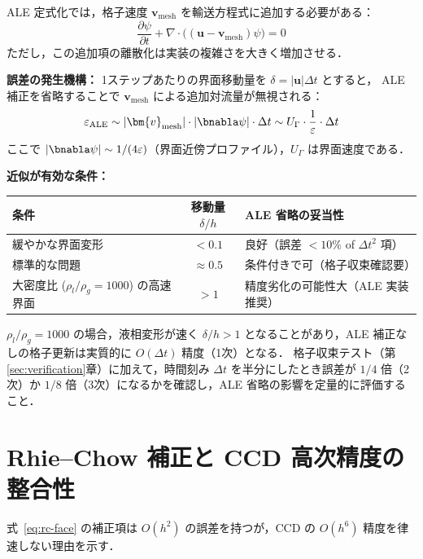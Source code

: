 \begin{tcolorbox}[warnbox, title={ALE 定式化の概要と省略の条件}]
ALE 定式化では，格子速度 $\bm{v}_\text{mesh}$ を輸送方程式に追加する必要がある：
\[
  \frac{\partial\psi}{\partial t} + \nabla\cdot\bigl((\bm{u} - \bm{v}_\text{mesh})\psi\bigr) = 0
\]
ただし，この追加項の離散化は実装の複雑さを大きく増加させる．
\end{tcolorbox}

\textbf{誤差の発生機構：}
1ステップあたりの界面移動量を $\delta = |\bm{u}|\Delta t$ とすると，
ALE 補正を省略することで $\bm{v}_\text{mesh}$ による追加対流量が無視される：
\[
  \varepsilon_{\text{ALE}} \sim |\bm{v}_\text{mesh}| \cdot |\bnabla\psi| \cdot \Delta t \sim U_\Gamma \cdot \frac{1}{\varepsilon} \cdot \Delta t
\]
ここで $|\bnabla\psi| \sim 1/(4\varepsilon)$（界面近傍プロファイル），$U_\Gamma$ は界面速度である．

\textbf{近似が有効な条件：}
\begin{center}
\renewcommand{\arraystretch}{1.3}
\begin{tabular}{>{\raggedright\arraybackslash}p{48mm}c>{\raggedright\arraybackslash}p{42mm}}
\hline
条件 & 移動量 $\delta/h$ & ALE 省略の妥当性 \\
\hline
緩やかな界面変形 & $< 0.1$ & 良好（誤差 $< 10\%$ of $\Delta t^2$ 項） \\
標準的な問題 & $\approx 0.5$ & 条件付きで可（格子収束確認要） \\
大密度比 ($\rho_l/\rho_g{=}1000$) の高速界面 & $> 1$ & 精度劣化の可能性大（ALE 実装推奨） \\
\hline
\end{tabular}
\end{center}

$\rho_l/\rho_g = 1000$ の場合，液相変形が速く $\delta/h > 1$ となることがあり，ALE 補正なしの格子更新は実質的に $O(\Delta t)$ 精度（1次）となる．
格子収束テスト（第\ref{sec:verification}章）に加えて，時間刻み $\Delta t$ を半分にしたとき誤差が $1/4$ 倍（2次）か $1/8$ 倍（3次）になるかを確認し，ALE 省略の影響を定量的に評価すること．

\section{Rhie--Chow 補正と CCD 高次精度の整合性}
\label{app:rc_precision}

式~\eqref{eq:rc-face} の補正項は $O(h^2)$ の誤差を持つが，CCD の $O(h^6)$ 精度を律速しない理由を示す．

